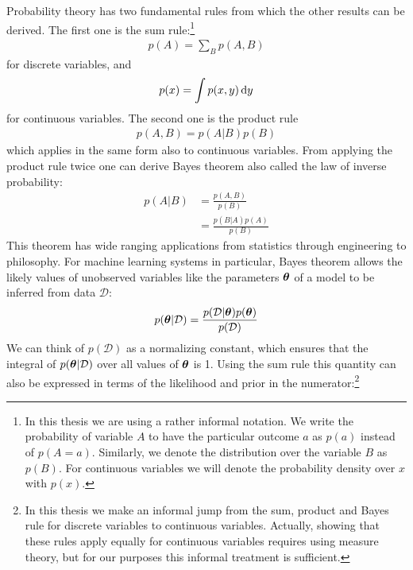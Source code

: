 \documentclass[../thesis.tex]{subfiles}
\begin{document}
Probability theory has two fundamental rules from which the other results can be derived. The first one is the sum rule:\footnote{In this thesis we are using a rather informal notation. We write the probability of variable $A$ to have the particular outcome $a$ as $p(a)$ instead of $p(A=a)$. Similarly, we denote the distribution over the variable $B$ as $p(B)$. For continuous variables we will denote the probability density over $x$ with $p(x)$.}
\begin{equation}
    \begin{split}
        p(A) = \sum_{B} p(A, B) 
    \end{split}
\end{equation}
for discrete variables, and 
\begin{equation}
    \begin{split}
        p(x) = \int p(x, y) \mathop{}\!\mathrm{d} y 
    \end{split}
\end{equation}
for continuous variables. The second one is the product rule
\begin{equation}
    \begin{split}
        p(A, B) = p(A|B)p(B)
    \end{split}
\end{equation}
which applies in the same form also to continuous variables.
From applying the product rule twice one can derive Bayes theorem also called the law of inverse probability:
\begin{equation}
    \begin{split}
        p(A | B) &= \frac{p(A, B)}{p(B)}\\
        &= \frac{p(B | A) p(A)}  {p(B)} %
    \end{split}
\end{equation}
This theorem has wide ranging applications from statistics through engineering to philosophy. For machine learning systems in particular, Bayes theorem allows the likely values of unobserved variables like the parameters $\boldsymbol{\mathbf{\theta}}$ of a model to be inferred from data $\mathcal{D}$:
\begin{equation}
    \begin{split}
        p(\boldsymbol{\mathbf{\theta}} | \mathcal{D}) = \frac{p(\mathcal{D} | \boldsymbol{\mathbf{\theta}}) p(\boldsymbol{\mathbf{\theta}})}  {p(\mathcal{D})}
    \end{split}
\end{equation}
We can think of $p(\mathcal{D})$ as a normalizing constant, which ensures that the integral of $p(\boldsymbol{\mathbf{\theta}} | \mathcal{D})$ over all values of $\boldsymbol{\mathbf{\theta}}$ is 1. Using the sum rule this quantity can also be expressed in terms of the likelihood and prior in the numerator:\footnote{In this thesis we make an informal jump from the sum, product and Bayes rule for discrete variables to continuous variables. Actually, showing that these rules apply equally for continuous variables requires using measure theory, but for our purposes this informal treatment is sufficient.}
\end{document}
